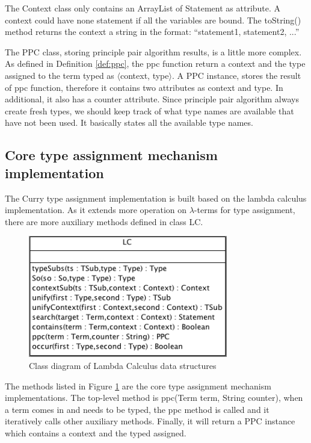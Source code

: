The \textsf{Context} class only contains an \textsf{ArrayList} of \textsf{Statement} as attribute. A context could have none statement if all the variables are bound. The \textsf{toString()} method returns the context a string in the format: ``statement1, statement2, ...'' 

The \textsf{PPC} class, storing principle pair algorithm results, is a little more complex. As defined in Definition \ref{def:ppc}, the ppc function return a context and the type assigned to the term typed as $\langle$context, type$\rangle$. A PPC instance, stores the result of ppc function, therefore it contains two attributes as context and type. In additional, it also has a counter attribute. Since principle pair algorithm always create \textsf{fresh} types, we should keep track of what type names are available that have not been used. It basically states all the available type names.   

\subsection{Core type assignment mechanism implementation}

The Curry type assignment implementation is built based on the lambda calculus implementation. As it extends more operation on $\lambda$-terms for type assignment, there are more auxiliary methods defined in class \textsf{LC}. 

\begin{figure}[ht]
\centering
\includegraphics[scale=0.6]{pics/LCType}
\caption{Class diagram of Lambda Calculus data structures}
\label{fig:lctype}
\end{figure}


The methods listed in Figure \ref{fig:lctype} are the core type assignment mechanism implementations. The top-level method is \textsf{ppc(Term term, String counter)}, when a term comes in and needs to be typed, the ppc method is called and it iteratively calls other auxiliary methods. Finally, it will return a \textsf{PPC} instance which contains a context and the typed assigned. 

